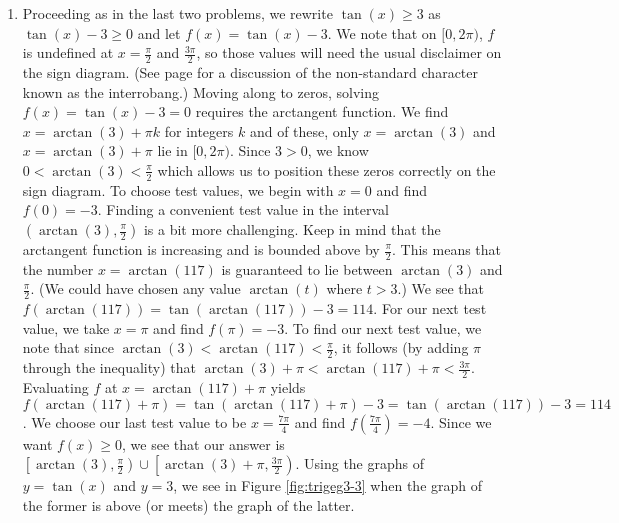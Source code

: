 {\begin{enumerate}
\item  Proceeding as in the last two problems, we rewrite  $\tan(x) \geq 3$ as $\tan(x) - 3 \geq 0$ and let $f(x) = \tan(x) - 3$.  We note that on $[0,2\pi)$, $f$ is undefined at $x =\frac{\pi}{2}$ and $\frac{3\pi}{2}$, so those values will need the usual disclaimer on the sign diagram. (See page \pageref{rationalsigndiagram} for a discussion of the non-standard character known as the interrobang.)  Moving along to zeros, solving $f(x) = \tan(x) - 3 = 0$ requires the arctangent function.  We find $x = \arctan(3) + \pi k$ for integers $k$ and of these, only $x = \arctan(3)$ and $x = \arctan(3) + \pi$ lie in $[0,2\pi)$.  Since $3 > 0$, we know $0 < \arctan(3) < \frac{\pi}{2}$ which allows us to position these zeros correctly on the sign diagram. To choose test values, we begin with $x=0$ and find $f(0) = -3$. Finding a convenient test value in the interval $\left(\arctan(3), \frac{\pi}{2}\right)$ is a bit more challenging.  Keep in mind that the arctangent function is increasing and is bounded above by $\frac{\pi}{2}$.  This means that the number $x = \arctan(117)$ is guaranteed to lie between  $\arctan(3)$ and $\frac{\pi}{2}$. (We could have chosen any value $\arctan(t)$ where $t > 3$.)  We see that $f(\arctan(117)) = \tan(\arctan(117)) - 3 = 114$.  For our next test value, we take $x = \pi$ and find $f(\pi) = -3$.  To find our next test value, we note that since $\arctan(3) < \arctan(117) < \frac{\pi}{2}$,  it follows (by adding $\pi$ through the inequality) that $\arctan(3) + \pi < \arctan(117) + \pi < \frac{3\pi}{2}$.  Evaluating $f$ at $x = \arctan(117) + \pi$ yields $f(\arctan(117)+\pi) = \tan(\arctan(117) + \pi) -3 = \tan(\arctan(117)) - 3 = 114$.  We choose our last test value to be $x = \frac{7\pi}{4}$ and find $f\left(\frac{7\pi}{4}\right) = -4$.  Since we want $f(x) \geq 0$, we see that our answer is $\left[ \arctan(3), \frac{\pi}{2}\right) \cup  \left[\arctan(3)+\pi, \frac{3\pi}{2}\right)$.  Using the graphs of $y = \tan(x)$ and $y = 3$, we see in Figure \ref{fig:trigeg3-3} when the graph of the former is above (or meets) the graph of the latter.

\end{enumerate}
}

